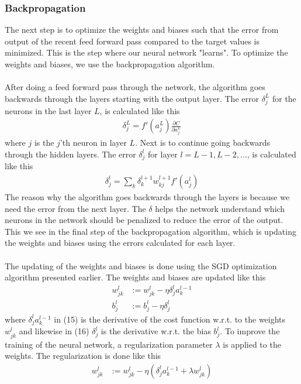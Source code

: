 \documentclass[a4paper,twocolumn]{article}
\begin{document}
\subsubsection{Backpropagation}
The next step is to optimize the weights and biases such that the error from output of the recent feed forward pass compared to the target values is minimized. This is the step where our neural network "learns". To optimize the weights and biases, we use the backpropagation algorithm.\\
\\
After doing a feed forward pass through the network, the algorithm goes backwards through the layers starting with the output layer. The error $\delta_{j}^{L}$ for the neurons in the last layer $L$, is calculated like this
\begin{align}
    \delta_{j}^{L} = f'(a_{j}^{L})\frac{\partial C}{\partial a_{j}^{L}}
\end{align}
where $j$ is the $j$'th neuron in layer $L$. Next is to continue going backwards through the hidden layers. The error $\delta_{j}^{l}$ for layer $l = L-1, L-2, ...$, is calculated like this
\begin{align}
    \delta_{j}^{l} = \sum_{k}\delta_{k}^{l+1}w_{kj}^{l+1}f'(a_{j}^{l})
\end{align}
The reason why the algorithm goes backwards through the layers is because we need the error from the next layer. The $\delta$ helps the network understand which neurons in the network should be penalized to reduce the error of the output. This we see in the final step of the backpropagation algorithm, which is updating the weights and biases using the errors calculated for each layer.\\
\\
The updating of the weights and biases is done using the SGD optimization algorithm presented earlier. The weights and biases are updated like this
\begin{align}
    w_{jk}^{l} &:= w_{jk}^{l} - \eta \delta_{j}^{l} a_{k}^{l - 1}\\
    b_{j}^{l} &:= b_{j}^{l} - \eta \delta_{j}^{l}
\end{align}
where $\delta_{j}^{l}a_{k}^{l - 1}$ in (15) is the derivative of the cost function w.r.t. to the weights $w_{jk}^{l}$ and likewise in (16) $\delta_{j}^{l}$ is the derivative w.r.t. the bias $b_{j}^{l}$. To improve the training of the neural network, a regularization parameter $\lambda$ is applied to the weights. The regularization is done like this
\begin{align}
    w_{jk}^{l} &:= w_{jk}^{l} - \eta (\delta_{j}^{l} a_{k}^{l - 1} + \lambda w_{jk}^{l})
\end{align}
\end{document}
